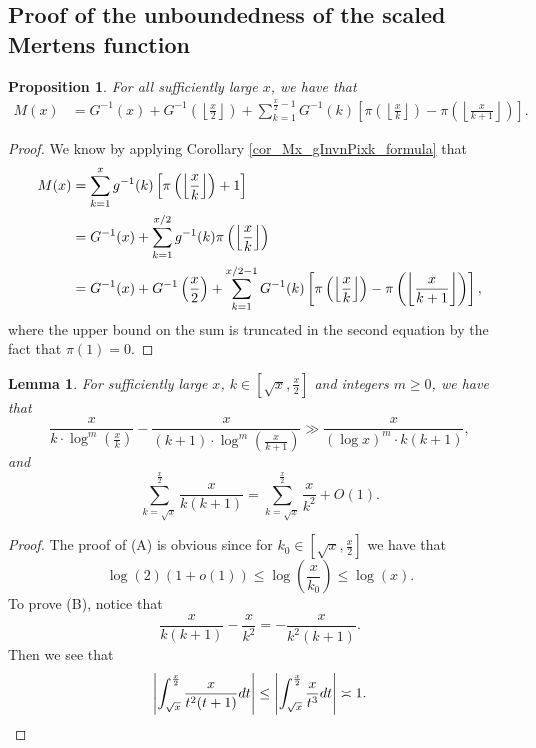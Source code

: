 \documentclass[11pt,reqno,a4letter]{article}
\numberwithin{figure}{section}
\numberwithin{table}{section}
\newcommand{\Floor}[2]{\ensuremath{\left\lfloor \frac{#1}{#2} \right\rfloor}}
\theoremstyle{plain}
\newtheorem{prop}[theorem]{Proposition}
\newtheorem{lemma}[theorem]{Lemma}
\numberwithin{theorem}{section}
\theoremstyle{definition}
\begin{document}
\subsection{Proof of the unboundedness of the scaled Mertens function}
\label{subSection_TheCoreResultProof} 

\begin{prop} 
\label{prop_Mx_SBP_IntegralFormula} 
For all sufficiently large $x$, we have that 
\begin{align} 
\label{eqn_pf_tag_v2-restated_v2} 
M(x) & = G^{-1}(x) + G^{-1}\left(\Floor{x}{2}\right) + 
     \sum_{k=1}^{\frac{x}{2}-1} G^{-1}(k) \left[ 
     \pi\left(\Floor{x}{k}\right) - \pi\left(\Floor{x}{k+1}\right) 
     \right]. 
\end{align} 
\end{prop} 
\begin{proof} 
We know by applying Corollary \ref{cor_Mx_gInvnPixk_formula} that 
\begin{align} 
\notag
M(x) & = \sum_{k=1}^{x} g^{-1}(k) \left[\pi\left(\Floor{x}{k}\right)+1\right] \\ 
\notag 
     & = G^{-1}(x) + \sum_{k=1}^{x/2} g^{-1}(k) \pi\left(\Floor{x}{k}\right) \\ 
\notag 
     & = G^{-1}(x) + G^{-1}\left(\frac{x}{2}\right) + 
     \sum_{k=1}^{x/2-1} G^{-1}(k) \left[ 
     \pi\left(\Floor{x}{k}\right) - \pi\left(\Floor{x}{k+1}\right) 
     \right], 
\end{align} 
where the upper bound on the sum is truncated in the second equation 
by the fact that $\pi(1) = 0$. 
\end{proof} 

\begin{lemma}
\label{lemma_PrimePix_ErrorBoundDiffs_SimplifyingConditions_v1} 
For sufficiently large $x$, $k \in \left[\sqrt{x}, \frac{x}{2}\right]$ and 
integers $m \geq 0$, we have that 
\begin{equation} 
\tag{A} 
\frac{x}{k \cdot \log^m\left(\frac{x}{k}\right)} - 
     \frac{x}{(k+1) \cdot \log^m\left(\frac{x}{k+1}\right)}
     \gg \frac{x}{(\log x)^m \cdot k(k+1)}, 
\end{equation} 
and 
\begin{equation} 
\tag{B} 
\sum_{k=\sqrt{x}}^{\frac{x}{2}} \frac{x}{k(k+1)} = 
     \sum_{k=\sqrt{x}}^{\frac{x}{2}} \frac{x}{k^2} + O(1). 
\end{equation} 
\end{lemma} 
\begin{proof} 
The proof of (A) is obvious since for $k_0 \in \left[\sqrt{x}, \frac{x}{2}\right]$ we have that 
\[
\log(2) (1 + o(1)) \leq \log\left(\frac{x}{k_0}\right) \leq \log(x). 
\]
To prove (B), notice that 
\[
\frac{x}{k(k+1)} - \frac{x}{k^2} = -\frac{x}{k^2(k+1)}. 
\]
Then we see that 
\[
\left\lvert \int_{\sqrt{x}}^{\frac{x}{2}} \frac{x}{t^2(t+1)} dt \right\rvert \leq 
     \left\lvert \int_{\sqrt{x}}^{\frac{x}{2}} \frac{x}{t^3} dt \right\rvert \asymp 1. 
     \qedhere 
\]
\end{proof} 
\end{document}
